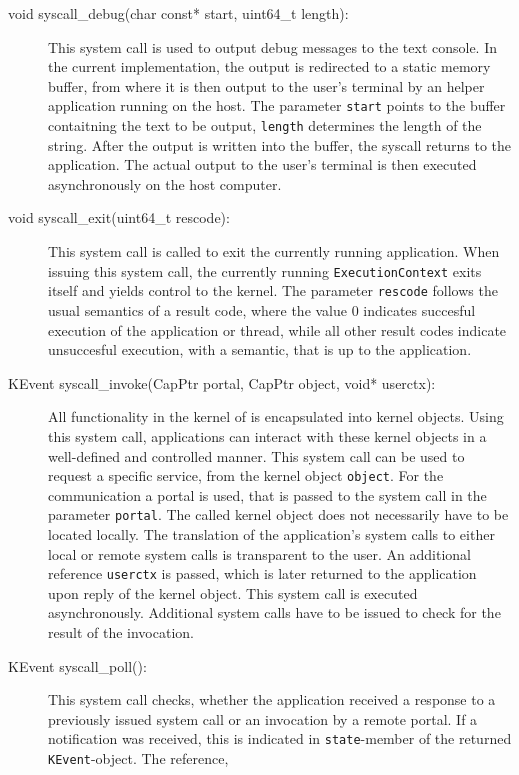 \begin{description}
\item[void syscall\_debug(char const* start, uint64\_t length):] This system
call is used to output debug messages to the text console. In the current
implementation, the output is redirected to a static memory buffer, from where
it is then output to the user's terminal by an helper application running on the
\mythos host. The parameter \texttt{start} points to the buffer contaitning the
text to be output, \texttt{length} determines the length of the string. After
the output is written into the buffer, the syscall returns to the application.
The actual output to the user's terminal is then executed asynchronously on the
host computer.
\item[void syscall\_exit(uint64\_t rescode):] This system call is called to exit
the currently running application. When issuing this system call, the currently
running \texttt{ExecutionContext} exits itself and yields control to the kernel.
The parameter \texttt{rescode} follows the usual semantics of a result code,
where the value $0$ indicates succesful execution of the application or thread,
while all other result codes indicate unsuccesful execution, with a semantic,
that is up to the application.
\item[KEvent syscall\_invoke(CapPtr portal, CapPtr object, void* userctx):] All
functionality in the kernel of \mythos is encapsulated into kernel objects.
Using this system call, applications can interact with these kernel objects in a
well-defined and controlled manner. This system call can be used to request a
specific service, from the kernel object \texttt{object}. For the communication
a portal is used, that is passed to the system call in the parameter
\texttt{portal}. The called kernel object does not necessarily have to be
located locally. The translation of the application's system calls to either
local or remote system calls is transparent to the user. An additional reference
\texttt{userctx} is passed, which is later returned to the application upon
reply of the kernel object. This system call is executed asynchronously.
Additional system calls have to be issued to check for the result of the
invocation.
\item[KEvent syscall\_poll():] This system call checks, whether the application
received a response to a previously issued system call or an invocation by a
remote portal. If a notification was received, this is indicated in
\texttt{state}-member of the returned \texttt{KEvent}-object. The reference,

\end{description}
